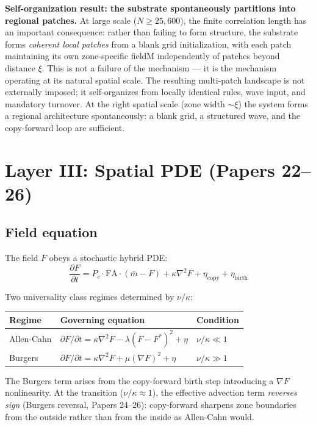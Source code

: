 \documentclass[11pt]{article}
\begin{document}
\textbf{Self-organization result: the substrate spontaneously partitions into regional patches.}
At large scale ($N \geq 25{,}600$), the finite correlation length has an important consequence:
rather than failing to form structure, the substrate forms \emph{coherent local patches} from
a blank grid initialization, with each patch maintaining its own zone-specific fieldM
independently of patches beyond distance $\xi$.
This is not a failure of the mechanism --- it is the mechanism operating at its natural spatial scale.
The resulting multi-patch landscape is not externally imposed; it self-organizes from
locally identical rules, wave input, and mandatory turnover.
At the right spatial scale (zone width $\sim \xi$) the system forms a regional architecture
spontaneously: a blank grid, a structured wave, and the copy-forward loop are sufficient.

\section{Layer III: Spatial PDE (Papers 22--26)}

\subsection{Field equation}

The field $F$ obeys a stochastic hybrid PDE:
\begin{equation}
\frac{\partial F}{\partial t} = P_c \cdot \mathrm{FA} \cdot (\bar{m} - F)
+ \kappa \nabla^2 F + \eta_\mathrm{copy} + \eta_\mathrm{birth}
\end{equation}

Two universality class regimes determined by $\nu/\kappa$:

\begin{center}
\begin{tabular}{lll}
\toprule
Regime & Governing equation & Condition \\
\midrule
Allen-Cahn & $\partial F/\partial t = \kappa\nabla^2 F - \lambda(F-F^*)^2 + \eta$ & $\nu/\kappa \ll 1$ \\
Burgers    & $\partial F/\partial t = \kappa\nabla^2 F + \mu(\nabla F)^2 + \eta$ & $\nu/\kappa \gg 1$ \\
\bottomrule
\end{tabular}
\end{center}

The Burgers term arises from the copy-forward birth step introducing a $\nabla F$ nonlinearity.
At the transition ($\nu/\kappa \approx 1$), the effective advection term
\emph{reverses sign} (Burgers reversal, Papers 24--26): copy-forward sharpens zone
boundaries from the outside rather than from the inside as Allen-Cahn would.
\end{document}
